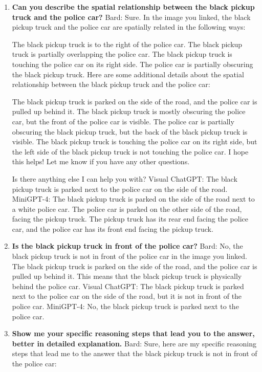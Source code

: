     \begin{enumerate}
        \item \textbf{Can you describe the spatial relationship between the  black pickup truck and the police car?}
        \subitem Bard: Sure. In the image you linked, the black pickup truck and the police car are spatially related in the following ways:

        The black pickup truck is to the right of the police car.
        The black pickup truck is partially overlapping the police car.
        The black pickup truck is touching the police car on its right side.
        The police car is partially obscuring the black pickup truck.
        Here are some additional details about the spatial relationship between the black pickup truck and the police car:
        
        The black pickup truck is parked on the side of the road, and the police car is pulled up behind it.
        The black pickup truck is mostly obscuring the police car, but the front of the police car is visible.
        The police car is partially obscuring the black pickup truck, but the back of the black pickup truck is visible.
        The black pickup truck is touching the police car on its right side, but the left side of the black pickup truck is not touching the police car.
        I hope this helps! Let me know if you have any other questions.
        
        Is there anything else I can help you with?
        \subitem Visual ChatGPT: The black pickup truck is parked next to the police car on the side of the road.
        \subitem MiniGPT-4: The black pickup truck is parked on the side of the road next to a white police car. The police car is parked on the other side of the road, facing the pickup truck. The pickup truck has its rear end facing the police car, and the police car has its front end facing the pickup truck.
        \item \textbf{Is the black pickup truck in front of the police car?}
        \subitem Bard: No, the black pickup truck is not in front of the police car in the image you linked. The black pickup truck is parked on the side of the road, and the police car is pulled up behind it. This means that the black pickup truck is physically behind the police car.
        \subitem Visual ChatGPT: The black pickup truck is parked next to the police car on the side of the road, but it is not in front of the police car.
        \subitem MiniGPT-4: No, the black pickup truck is parked next to the police car.
        \item \textbf{Show me your specific reasoning steps that lead you to the answer, better in detailed explanation.}
        \subitem Bard: 
        Sure, here are my specific reasoning steps that lead me to the answer that the black pickup truck is not in front of the police car:
        

\end{enumerate}
